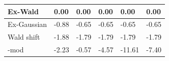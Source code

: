 \begin{tabular}{|l|l|l|l|l|l|}
\hline
Ex-Wald&0.00&0.00&0.00&0.00&0.00\\\hline
Ex-Gaussian&-0.88&-0.65&-0.65&-0.65&-0.65\\\hline
Wald shift&-1.88&-1.79&-1.79&-1.79&-1.79\\\hline
\rocdd{}-mod&-2.23&-0.57&-4.57&-11.61&-7.40\\\hline
\end{tabular}
